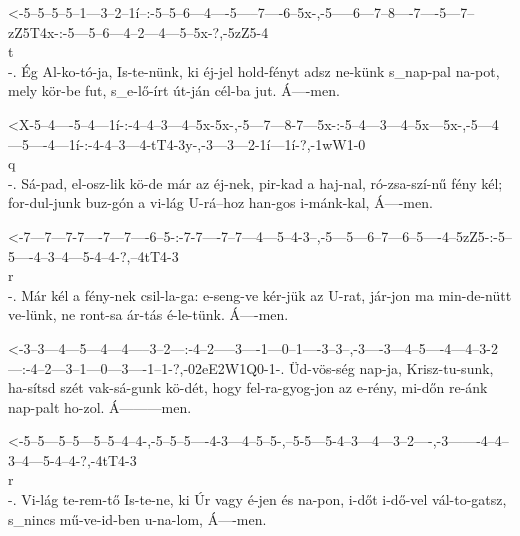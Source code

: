   {<-5--5--5--5--1---3--2--1í--:-5--5--6---4----5-----7----6--5x-,-5-----6---7--8----7----5---7--zZ5T4x-:-5---5--6---4--2---4---5--5x-?,-5zZ5-4\\t\\-.}
  {  Ég Al-ko-tó-ja, Is-te-nünk, ki éj-jel hold-fényt adsz ne-künk s_nap-pal na-pot, mely kör-be fut,     s_e-lő-írt út-ján cél-ba jut.  Á----men.}

  {<X-5--4----5--4---1í-:-4--4--3---4--5x-5x-,-5---7---8-7---5x-:-5--4---3---4--5x---5x-,-5---4---5----4---1í-:-4-4--3---4-tT4-3y-,-3---3---2-1í---1í-?,-1wW1-0\\q\\-.}
  {   Sá-pad, el-osz-lik  kö-de már az éj-nek, pir-kad a haj-nal, ró-zsa-szí-nű fény kél; for-dul-junk buz-gón  a vi-lág U-rá--hoz  han-gos i-mánk-kal,  Á----men.}

  {<-7---7---7-7----7---7----6--5-:-7-7----7--7---4---5--4-3--,-5---5---6--7---6--5----4--5zZ5-:-5--5----4--3--4---5-4--4-?,--4tT4-3\\r\\-.}
  {  Már kél a fény-nek csil-la-ga: e-seng-ve kér-jük az U-rat, jár-jon ma min-de-nütt ve-lünk,  ne ront-sa ár-tás é-le-tünk. Á----men.}

  {<-3--3---4---5---4---4-----3--2---:-4--2-----3----1---0--1----3--3--,-3----3---4--5----4---4--3-2---:-4--2---3--1---0---3----1--1-?,-02eE2W1Q0-1-.}
  {  Üd-vös-ség nap-ja, Krisz-tu-sunk, ha-sítsd szét vak-sá-gunk kö-dét, hogy fel-ra-gyog-jon az e-rény, mi-dőn re-ánk nap-palt ho-zol. Á---------men.}

  {<-5--5---5--5---5--5--4--4-,-5--5--5----4-3---4--5--5-,--5-5---5-4--3---4---3--2----,-3-------4--4--3--4---5-4--4-?,-4tT4-3\\r\\-.}
  {  Vi-lág te-rem-tő Is-te-ne, ki Úr vagy é-jen és na-pon, i-dőt i-dő-vel vál-to-gatsz, s_nincs mű-ve-id-ben u-na-lom, Á----men.}


\deftone{1la-a}{<-[-4-3-rR3-1-.}{1. lá tónus}
\deftone{1re-a}{<-[-4-3-4t-4-.}{1. ré tónus}


